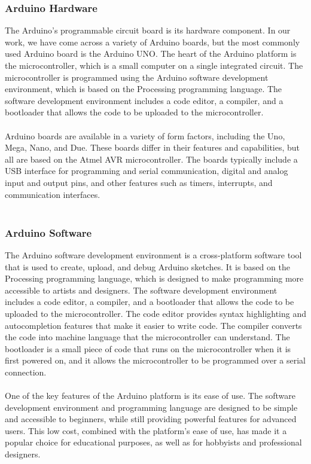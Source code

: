 \documentclass[12pt]{article}
\begin{document}
\subsubsection{Arduino Hardware}
The Arduino's programmable circuit board is its hardware component. In our work, we have come across a variety of Arduino boards, but the most commonly used Arduino board is the Arduino UNO. The heart of the Arduino platform is the microcontroller, which is a small computer on a single integrated circuit. The microcontroller is programmed using the Arduino software development environment, which is based on the Processing programming language. The software development environment includes a code editor, a compiler, and a bootloader that allows the code to be uploaded to the microcontroller.
\\
\\
Arduino boards are available in a variety of form factors, including the Uno, Mega, Nano, and Due. These boards differ in their features and capabilities, but all are based on the Atmel AVR microcontroller. The boards typically include a USB interface for programming and serial communication, digital and analog input and output pins, and other features such as timers, interrupts, and communication interfaces.
\\
 \\
\subsubsection{Arduino Software}
The Arduino software development environment is a cross-platform software tool that is used to create, upload, and debug Arduino sketches. It is based on the Processing programming language, which is designed to make programming more accessible to artists and designers. The software development environment includes a code editor, a compiler, and a bootloader that allows the code to be uploaded to the microcontroller. The code editor provides syntax highlighting and autocompletion features that make it easier to write code. The compiler converts the code into machine language that the microcontroller can understand. The bootloader is a small piece of code that runs on the microcontroller when it is first powered on, and it allows the microcontroller to be programmed over a serial connection.
\\
\\
One of the key features of the Arduino platform is its ease of use. The software development environment and programming language are designed to be simple and accessible to beginners, while still providing powerful features for advanced users. This low cost, combined with the platform's ease of use, has made it a popular choice for educational purposes, as well as for hobbyists and professional designers.
 \\
 \\
\end{document}
